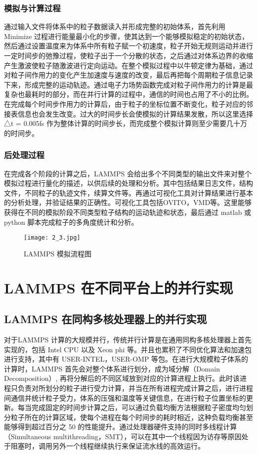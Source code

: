 \subsubsection{模拟与计算过程}
通过输入文件将体系中的粒子数据读入并形成完整的初始体系，首先利用Minimize 过程进行能量最小化的步骤，使其达到一个能够模拟稳定的初始状态，然后通过设置温度来为体系中所有粒子赋一个初速度，粒子开始无规则运动并进行一定时间步的弛豫过程，使粒子出于一个分散的状态，之后通过对体系边界的收缩产生激波使粒子随激波进行定向运动。在整个模拟过程中以牛顿定律为基础，通过对粒子间作用力的变化产生加速度与速度的改变，最后再把每个周期粒子信息记录下来，形成完整的运动轨迹。通过电子力场势函数完成对粒子间作用力的计算是最复杂也最耗时的部分，而在并行计算的过程中，通信的时间也占用了不小的比例。在完成每个时间步作用力的计算后，由于粒子的坐标位置不断变化，粒子对应的邻接表信息也会发生改变。过大的时间步长会使模拟的计算结果发散，所以这里选择△t = 0.005fs 作为整体计算的时间步长，而完成整个模拟计算则至少需要几十万的时间步。

\subsubsection{后处理过程}
在完成各个阶段的计算之后，LAMMPS 会给出多个不同类型的输出文件来对整个模拟过程进行量化的描述，以供后续的处理和分析。其中包括结果日志文件，结构文件，不同粒子的轨迹文件，续算文件等。再通过可视化工具对计算结果进行基本的分析处理，并验证结果的正确性。可视化工具包括OVITO，VMD等。这里能够获得在不同的模拟阶段不同类型粒子结构的运动轨迹和状态，最后通过 matlab 或 python 脚本完成粒子的多角度统计和分析。

 \begin{figure}[h]
  \centering
  \texttt{[image: 2\_3.jpg]}
  \caption{LAMMPS 模拟流程图}
  \label{fig:badge}
\end{figure}

\section{LAMMPS 在不同平台上的并行实现}
\subsection{LAMMPS 在同构多核处理器上的并行实现}
对于LAMMPS 计算的大规模并行，传统并行计算是在通用同构多核处理器上首先实现的，包括 Intel CPU 以及 Xeon phi 等。并且也累积了不同优化算法和加速包进行支持，其中有 USER-INTEL，USER-OMP 等包。在进行大规模粒子体系的计算时，LAMMPS 首先会对整个体系进行划分，成为域分解（Domain Decomposition）, 再将分解后的不同区域放到对应的计算进程上执行。此时该进程只负责对所划分的粒子进行受力计算，并当在所有进程完成计算之后，进行进程间通信并统计粒子受力，体系的压强和温度等关键信息，在进行粒子位置坐标的更新。每当完成固定的时间步计算之后，可以通过负载均衡方法根据粒子密度均匀划分粒子所在的计算区域，使每个进程在每个时间步的耗时相近，这种负载均衡甚至能够得到超过百分之 50 的性能提升。通过处理器硬件支持的同时多线程计算（Simultaneous multithreading，SMT），可以在其中一个线程因为访存等原因处于阻塞时，调用另外一个线程继续执行来保证流水线的高效运行。

